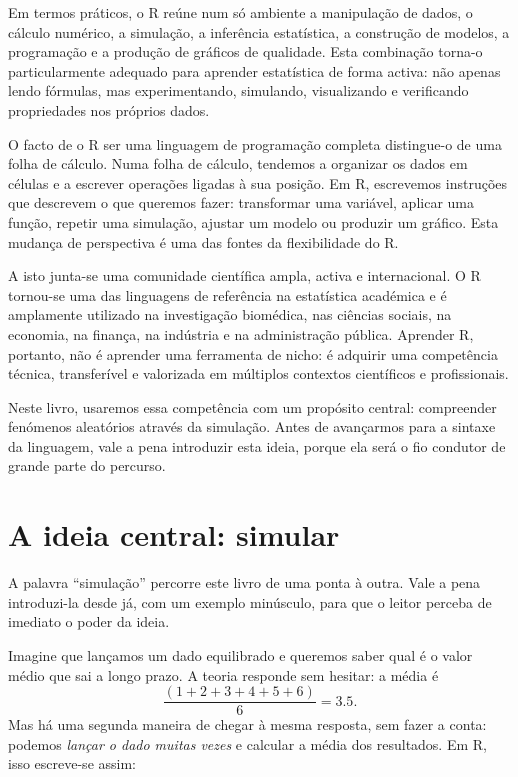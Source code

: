 \documentclass[
  portuguese,
  11pt,
  openany]{book}
\begin{document}
Em termos práticos, o R reúne num só ambiente a manipulação de dados, o cálculo numérico, a simulação, a inferência estatística, a construção de modelos, a programação e a produção de gráficos de qualidade. Esta combinação torna-o particularmente adequado para aprender estatística de forma activa: não apenas lendo fórmulas, mas experimentando, simulando, visualizando e verificando propriedades nos próprios dados.

O facto de o R ser uma linguagem de programação completa distingue-o de uma folha de cálculo. Numa folha de cálculo, tendemos a organizar os dados em células e a escrever operações ligadas à sua posição. Em R, escrevemos instruções que descrevem o que queremos fazer: transformar uma variável, aplicar uma função, repetir uma simulação, ajustar um modelo ou produzir um gráfico. Esta mudança de perspectiva é uma das fontes da flexibilidade do R.

A isto junta-se uma comunidade científica ampla, activa e internacional. O R tornou-se uma das linguagens de referência na estatística académica e é amplamente utilizado na investigação biomédica, nas ciências sociais, na economia, na finança, na indústria e na administração pública. Aprender R, portanto, não é aprender uma ferramenta de nicho: é adquirir uma competência técnica, transferível e valorizada em múltiplos contextos científicos e profissionais.

Neste livro, usaremos essa competência com um propósito central: compreender fenómenos aleatórios através da simulação. Antes de avançarmos para a sintaxe da linguagem, vale a pena introduzir esta ideia, porque ela será o fio condutor de grande parte do percurso.

\section{A ideia central: simular}\label{a-ideia-central-simular}

A palavra ``simulação'' percorre este livro de uma ponta à outra. Vale a pena
introduzi-la desde já, com um exemplo minúsculo, para que o leitor perceba de imediato o poder da ideia.

Imagine que lançamos um dado equilibrado e queremos saber qual é o valor médio que sai a longo prazo. A teoria responde sem hesitar: a média é
\[\frac{(1+2+3+4+5+6)}{6} = 3.5.\] Mas há uma segunda maneira de chegar à mesma resposta, sem fazer a conta: podemos \emph{lançar o dado muitas vezes} e calcular a média dos resultados. Em R, isso escreve-se assim:
\end{document}
